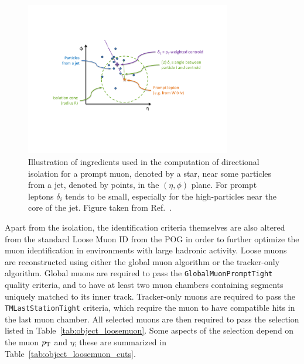 \begin{figure}[htpb]
  \centering
  \includegraphics[width=0.8\textwidth]{figures/eventreco_objects/directional_iso_cartoon}
  \caption{Illustration of ingredients used in the computation of directional isolation for a prompt
muon, denoted by a star, near some particles from a jet, denoted by points, in the $(\eta,\phi)$
plane. For prompt leptons $\delta_i$ tends to be small, especially for the high-\pt particles near
the core of the jet. Figure taken from Ref.~\cite{CMS-AN2011-498}.
  \label{fig:object_directional_iso}}
\end{figure}

Apart from the isolation, the identification criteria themselves are also altered from the standard
Loose Muon ID from the POG in order to further optimize the muon identification in environments
with large hadronic activity. 
Loose muons are reconstructed using either the global muon algorithm or the tracker-only
algorithm. 
Global muons are required to pass the {\tt GlobalMuonPromptTight} quality criteria,
and to have at least two muon chambers containing segments uniquely matched to its inner track. 
Tracker-only muons are required to pass the {\tt TMLastStationTight} criteria, which require the
muon to have compatible hits in the last muon chamber. 
All selected muons are then required to pass the selection listed in
Table~\ref{tab:object_loosemuon}. 
Some aspects of the selection depend on the muon $p_{\mathrm{T}}$ and $\eta$; these are summarized in
Table~\ref{tab:object_loosemuon_cuts}.

